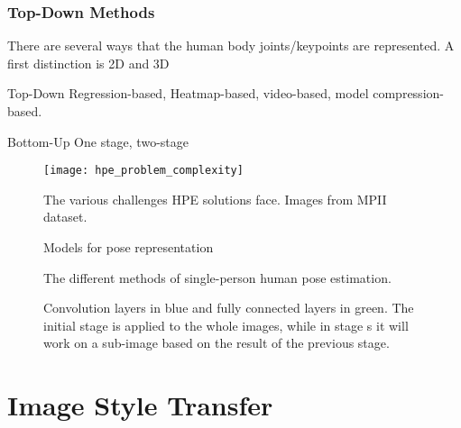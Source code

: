\subsubsection{Top-Down Methods}




There are several ways that the human body joints/keypoints are represented.
A first distinction is 2D and 3D

Top-Down
Regression-based, Heatmap-based, video-based, model compression-based.

Bottom-Up
One stage, two-stage


\begin{figure}
	\centering
	\texttt{[image: hpe\_problem\_complexity]}
	\caption{The various challenges HPE solutions face. Images from \gls{MPII} dataset. \cite{Andriluka2014}\cite{Chen2000}}
	\label{fig:hpe_problem_complexity}
\end{figure}

\begin{figure}
	\centering
	\caption{Models for pose representation \cite{Zheng2012}}
	\label{fig:pose_representation}
\end{figure}

\begin{figure}
	\centering
	\caption{The different methods of single-person human pose estimation.\cite{Zheng2012}}
	\label{fig:pose_representation}
\end{figure}

\begin{figure}
	\centering
	\caption{
		Convolution layers in blue and fully connected layers in green.
		The initial stage is applied to the whole images, while in stage s it will work on a sub-image based on the result of the previous stage.\cite{Toshev2014}
	}
	\label{fig:pose_representation}
\end{figure}

\section{Image Style Transfer}
\label{sec:ist}